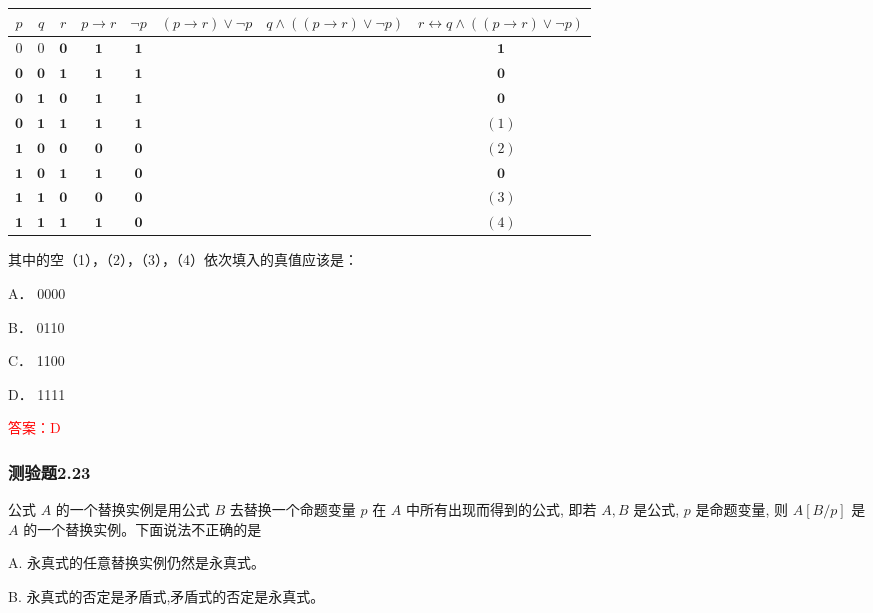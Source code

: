 \documentclass[UTF8, heading=true]{ctexart}
\begin{document}
\begin{table}[htbp]
  \centering
  \renewcommand{\arraystretch}{1.2}
\begin{tabular}{c|c|c|c|c|c|c|c}
\hline$p$ & $q$ & $r$ & $p \rightarrow r$ & $\neg p$ & $(p \rightarrow r) \vee \neg p$ & $q \wedge((p \rightarrow r) \vee \neg p)$ & $r \leftrightarrow q \wedge((p \rightarrow r) \vee \neg p)$ \\
\hline 0 & 0 & $\mathbf{0}$ & $\mathbf{1}$ & $\mathbf{1}$ & & & $\mathbf{1}$ \\
\hline $\mathbf{0}$ & $\mathbf{0}$ & $\mathbf{1}$ & $\mathbf{1}$ & $\mathbf{1}$ & & & $\mathbf{0}$ \\
\hline $\mathbf{0}$ & $\mathbf{1}$ & $\mathbf{0}$ & $\mathbf{1}$ & $\mathbf{1}$ & & & $\mathbf{0}$ \\
\hline $\mathbf{0}$ & $\mathbf{1}$ & $\mathbf{1}$ & $\mathbf{1}$ & $\mathbf{1}$ & & & $(1)$ \\
\hline $\mathbf{1}$ & $\mathbf{0}$ & $\mathbf{0}$ & $\mathbf{0}$ & $\mathbf{0}$ & & & $(2)$ \\
\hline $\mathbf{1}$ & $\mathbf{0}$ & $\mathbf{1}$ & $\mathbf{1}$ & $\mathbf{0}$ & & & $\mathbf{0}$ \\
\hline $\mathbf{1}$ & $\mathbf{1}$ & $\mathbf{0}$ & $\mathbf{0}$ & $\mathbf{0}$ & & & $(3)$ \\
\hline $\mathbf{1}$ & $\mathbf{1}$ & $\mathbf{1}$ & $\mathbf{1}$ & $\mathbf{0}$ & & & $(4)$ \\
\hline
\end{tabular}
\end{table}

其中的空（1），（2），（3），（4）依次填入的真值应该是： $\qquad$

A．
0000

B．
0110

C．
1100

D．
1111

\textcolor{red}{答案：D}


\subsubsection{测验题2.23}

公式 $A$ 的一个替换实例是用公式 $B$ 去替换一个命题变量 $p$ 在 $A$ 中所有出现而得到的公式, 即若 $A, B$ 是公式, $p$ 是命题变量, 则 $A[B / p]$ 是 $A$ 的一个替换实例。下面说法不正确的是 $\qquad$

A. 永真式的任意替换实例仍然是永真式。

B. 永真式的否定是矛盾式,矛盾式的否定是永真式。
\end{document}
